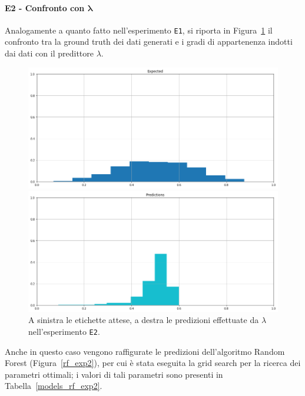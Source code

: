 \documentclass[12pt]{report}
\theoremstyle{definition}
\begin{document}
\paragraph{E2 - Confronto con $\bm{\lambda}$}
Analogamente a quanto fatto nell'esperimento \texttt{E1}, si riporta in Figura~\ref{prediction_exp2} il confronto tra la ground truth dei dati generati e i gradi di appartenenza indotti dai dati con il predittore $\lambda$.
\begin{figure}
\centering
    \begin{minipage}{0.48\textwidth}
        \includegraphics[width=\linewidth]{images/experiment_beta5_disgiunti/expected_memberships.png}
    \end{minipage}
    \begin{minipage}{0.48\textwidth}
        \includegraphics[width=\linewidth]{images/experiment_beta5_disgiunti/prediction_memberships.png}
    \end{minipage}
    \caption{A sinistra le etichette attese, a destra le predizioni effettuate da $\lambda$ nell'esperimento \texttt{E2}.}
    \label{prediction_exp2}
\end{figure} 

Anche in questo caso vengono raffigurate le predizioni dell'algoritmo Random Forest (Figura~\ref{rf_exp2}), per cui è stata eseguita la grid search per la ricerca dei parametri ottimali; i valori di tali parametri sono presenti in Tabella~\ref{models_rf_exp2}.
\end{document}

